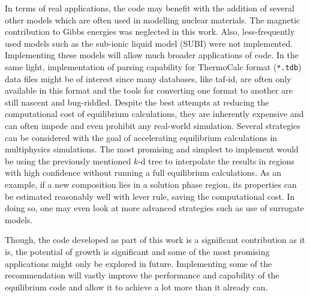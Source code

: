 	In terms of real applications, the code may benefit with the addition of several other models which are often used in modelling nuclear materials. The magnetic contribution to Gibbs energies was neglected in this work. Also, less-frequently used models such as the sub-ionic liquid model (SUBI) were not implemented. Implementing these models will allow much broader applications of code. In the same light, implementation of parsing capability for ThermoCalc format (\texttt{*.tdb}) data files might be of interest since many databases, like \gls{taf-id}, are often only available in this format and the tools for converting one format to another are still nascent and bug-riddled. Despite the best attempts at reducing the computational cost of equilibrium calculations, they are inherently expensive and can often impede and even prohibit any real-world simulation. Several strategies can be considered with the goal of accelerating equilibrium calculations in multiphysics simulations. The most promising and simplest to implement would be using the previously mentioned $k$-d tree to interpolate the results in regions with high confidence without running a full equilibrium calculations. As an example, if a new composition lies in a solution phase region, its properties can be estimated reasonably well with lever rule, saving the computational cost. In doing so, one may even look at more advanced strategies such as use of surrogate models.
 
    Though, the code developed as part of this work is a significant contribution as it is, the potential of growth is significant and some of the most promising applications might only be explored in future. Implementing some of the recommendation will vastly improve the performance and capability of the equilibrium code and allow it to achieve a lot more than it already can.